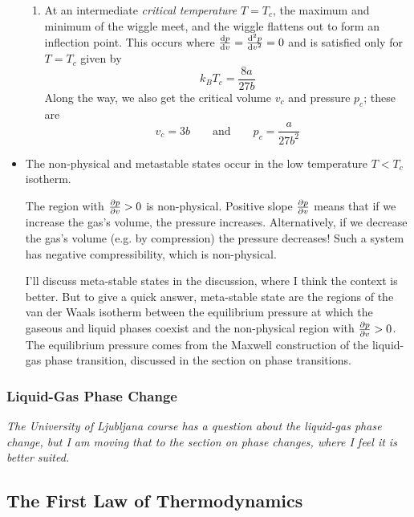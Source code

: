 \documentclass[11pt, a4paper]{article}
\begin{document}
\begin{itemize}
\begin{enumerate}
		\item At an intermediate \textit{critical temperature}  $ T = T_{c} $, the maximum and minimum of the wiggle meet, and the wiggle flattens out to form an inflection point. This occurs where $ \dv{p}{v} = \dv[2]{p}{v} = 0 $ and is satisfied only for $ T = T_{c} $ given by
		\begin{equation*}
			k_{B}T_{c} = \frac{8a}{27b}
		\end{equation*}
		Along the way, we also get the critical volume $ v_{c} $ and pressure $ p_{c} $; these are
		\begin{equation*}
			v_{c} = 3b \qquad \text{and} \qquad p_{c} = \frac{a}{27b^{2}}
		\end{equation*}
	\end{enumerate}
	
	\item The non-physical and metastable states occur in the low temperature $ T < T_{c} $ isotherm. 	
	
	The region with $ \pdv{p}{v} > 0 $ is non-physical. Positive slope $ \pdv{p}{v} $ means that if we increase the gas's volume, the pressure increases. Alternatively, if we decrease the gas's volume (e.g. by compression) the pressure decreases! Such a system has negative compressibility, which is non-physical. 
	
	I'll discuss meta-stable states in the discussion, where I think the context is better. But to give a quick answer, meta-stable state are the regions of the van der Waals isotherm between the equilibrium pressure at which the gaseous and liquid phases coexist and the non-physical region with $ \pdv{p}{v} > 0 $. The equilibrium pressure comes from the Maxwell construction of the liquid-gas phase transition, discussed in the section on phase transitions.
	
\end{itemize}
 
\subsubsection{Liquid-Gas Phase Change}
\textit{The University of Ljubljana course has a question about the liquid-gas phase change, but I am moving that to the section on phase changes, where I feel it is better suited.}


\subsection{The First Law of Thermodynamics}
\end{document}
